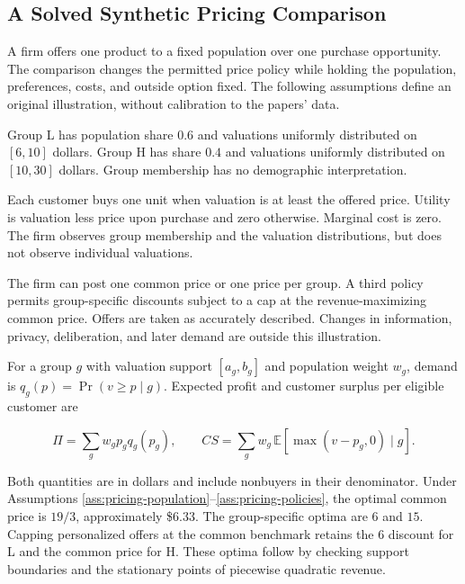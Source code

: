 \noindent \hypertarget{M09-a-solved-synthetic-pricing-comparison}{%
\subsection{A Solved Synthetic Pricing
Comparison}\label{M09-a-solved-synthetic-pricing-comparison}}

\noindent A firm offers one product to a fixed population over one purchase
opportunity. The comparison changes the permitted price policy while
holding the population, preferences, costs, and outside option fixed.
The following assumptions define an original illustration, without
calibration to the papers' data.

\begin{assumption}\label{ass:pricing-population}
Group L has population share $0.6$ and valuations uniformly distributed on $[6,10]$ dollars. Group H has share $0.4$ and valuations uniformly distributed on $[10,30]$ dollars. Group membership has no demographic interpretation.
\end{assumption}

\begin{assumption}\label{ass:pricing-choice}
Each customer buys one unit when valuation is at least the offered price. Utility is valuation less price upon purchase and zero otherwise. Marginal cost is zero. The firm observes group membership and the valuation distributions, but does not observe individual valuations.
\end{assumption}

\begin{assumption}\label{ass:pricing-policies}
The firm can post one common price or one price per group. A third policy permits group-specific discounts subject to a cap at the revenue-maximizing common price. Offers are taken as accurately described. Changes in information, privacy, deliberation, and later demand are outside this illustration.
\end{assumption}

For a group \(g\) with valuation support \([a_g,b_g]\) and population
weight \(w_g\), demand is \(q_g(p)=\Pr(v\geq p\mid g)\). Expected profit
and customer surplus per eligible customer are

\[
\Pi=\sum_g w_g p_g q_g(p_g),\qquad
CS=\sum_g w_g\,\mathbb{E}[\max(v-p_g,0)\mid g].
\]

Both quantities are in dollars and include nonbuyers in their
denominator. Under Assumptions
\ref{ass:pricing-population}--\ref{ass:pricing-policies}, the optimal
common price is \(19/3\), approximately \$6.33. The group-specific
optima are \(6\) and \(15\). Capping personalized offers at the common
benchmark retains the \(6\) discount for L and the common price for H.
These optima follow by checking support boundaries and the stationary
points of piecewise quadratic revenue.

